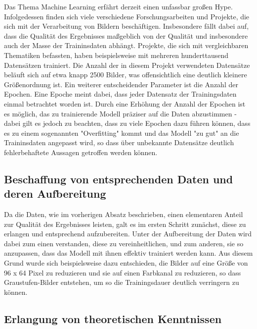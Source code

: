 Das Thema Machine Learning erfährt derzeit einen unfassbar großen Hype. Infolgedessen finden sich viele verschiedene
Forschungsarbeiten und Projekte, die sich mit der Verarbeitung von Bildern beschäftigen. Insbesondere fällt dabei auf,
dass die Qualität des Ergebnisses maßgeblich von der Qualität und insbesondere auch der Masse der Traininsdaten abhängt.
Projekte, die sich mit vergleichbaren Thematiken befassten, haben beispielsweise mit mehreren hunderttausend Datensätzen
trainiert. Die Anzahl der in diesem Projekt verwendeten Datensätze beläuft sich auf etwa knapp 2500 Bilder, was
offensichtlich eine deutlich kleinere Größenordnung ist.
Ein weiterer entscheidender Parameter ist die Anzahl der Epochen. Eine Epoche meint dabei, dass jeder Datensatz der
Trainingsdaten einmal betrachtet worden ist. Durch eine Erhöhung der Anzahl der Epochen ist es möglich, das zu trainierende
Modell präziser auf die Daten abzustimmen - dabei gilt es jedoch zu beachten, dass zu viele Epochen dazu führen können,
dass es zu einem sogenannten "Overfitting" kommt und das Modell "zu gut" an die Traininsdaten angepasst wird, so dass
über unbekannte Datensätze deutlich fehlerbehaftete Aussagen getroffen werden können.

\subsection{Beschaffung von entsprechenden Daten und deren Aufbereitung}

Da die Daten, wie im vorherigen Absatz beschrieben, einen elementaren Anteil zur Qualität des Ergebnisses leisten, galt
es im ersten Schritt zunächst, diese zu erlangen und entsprechend aufzubereiten. Unter der Aufbereitung der Daten wird
dabei zum einen verstanden, diese zu vereinheitlichen, und zum anderen, sie so anzupassen, dass das Modell mit ihnen
effektiv trainiert werden kann. Aus diesem Grund wurde sich beispielsweise dazu entschieden, die Bilder auf eine Größe
von 96 x 64 Pixel zu reduzieren und sie auf einen Farbkanal zu reduzieren, so dass Graustufen-Bilder entstehen, um so
die Trainingsdauer deutlich verringern zu können.

\subsection{Erlangung von theoretischen Kenntnissen}

